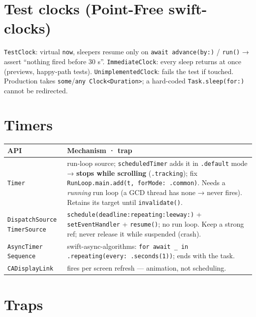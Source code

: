 \documentclass[8pt]{extarticle}
\begin{document}
\begin{multicols}{2}
\columnbreak

\section{Test clocks (Point-Free swift-clocks)}
\texttt{TestClock}: virtual \texttt{now}, sleepers resume only on
\texttt{await advance(by:)} / \texttt{run()} → assert ``nothing fired before 30 s''.
\texttt{ImmediateClock}: every sleep returns at once (previews, happy-path tests).
\texttt{UnimplementedClock}: fails the test if touched. Production takes
\texttt{some}/\texttt{any Clock<Duration>}; a hard-coded \texttt{Task.sleep(for:)}
cannot be redirected.

\section{Timers}
{\footnotesize\setlength{\tabcolsep}{3pt}
\begin{tabular}{@{}L{19mm}L{56mm}@{}}
\toprule
\textbf{API} & \textbf{Mechanism · trap} \\
\midrule
\texttt{Timer} & run-loop source; \texttt{scheduledTimer} adds it in \texttt{.default}
  mode → \textbf{stops while scrolling} (\texttt{.tracking}); fix
  \texttt{RunLoop.main.add(t, forMode: .common)}. Needs a \emph{running} run loop
  (a GCD thread has none → never fires). Retains its target until
  \texttt{invalidate()}. \\
\texttt{DispatchSource} \texttt{TimerSource} & \texttt{schedule(deadline:repeating:leeway:)}
  + \texttt{setEventHandler} + \texttt{resume()}; no run loop. Keep a strong ref;
  never release it while suspended (crash). \\
\texttt{AsyncTimer} \texttt{Sequence} & swift-async-algorithms:
  \texttt{for await \_ in .repeating(every: .seconds(1))}; ends with the task. \\
\texttt{CADisplayLink} & fires per screen refresh — animation, not scheduling. \\
\bottomrule
\end{tabular}}

\section{Traps}
\begin{itemize}
\end{itemize}


\end{multicols}
\end{document}
